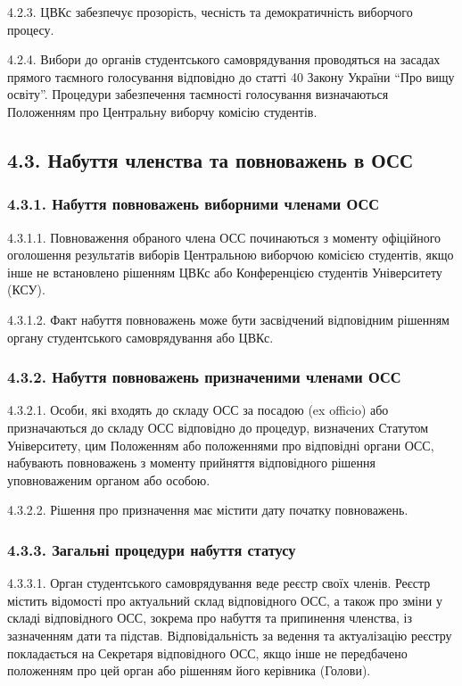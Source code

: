     4.2.3. ЦВКс забезпечує прозорість, чесність та демократичність виборчого процесу.

    4.2.4. Вибори до органів студентського самоврядування проводяться на засадах прямого таємного голосування відповідно до статті 40 Закону України ``Про вищу освіту''. Процедури забезпечення таємності голосування визначаються Положенням про Центральну виборчу комісію студентів.

\subsection*{4.3. Набуття членства та повноважень в ОСС}
    \subsubsection*{4.3.1. Набуття повноважень виборними членами ОСС}
        4.3.1.1. Повноваження обраного члена ОСС починаються з моменту офіційного оголошення результатів виборів Центральною виборчою комісією студентів, якщо інше не встановлено рішенням ЦВКс або Конференцією студентів Університету (КСУ).

        4.3.1.2. Факт набуття повноважень може бути засвідчений відповідним рішенням органу студентського самоврядування або ЦВКс.

    \subsubsection*{4.3.2. Набуття повноважень призначеними членами ОСС}
        4.3.2.1. Особи, які входять до складу ОСС за посадою (ex officio) або призначаються до складу ОСС відповідно до процедур, визначених Статутом Університету, цим Положенням або положеннями про відповідні органи ОСС, набувають повноважень з моменту прийняття відповідного рішення уповноваженим органом або особою.

        4.3.2.2. Рішення про призначення має містити дату початку повноважень.

    \subsubsection*{4.3.3. Загальні процедури набуття статусу}
        4.3.3.1. Орган студентського самоврядування веде реєстр своїх членів. Реєстр містить відомості про актуальний склад відповідного ОСС, а також про зміни у складі відповідного ОСС, зокрема про набуття та припинення членства, із зазначенням дати та підстав. Відповідальність за ведення та актуалізацію реєстру покладається на Секретаря відповідного ОСС, якщо інше не передбачено положенням про цей орган або рішенням його керівника (Голови).

